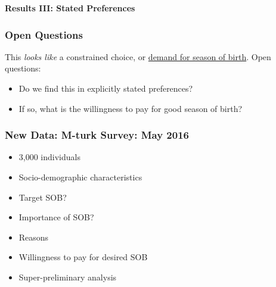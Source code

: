 \documentclass[10pt,letterpaper,subeqn]{beamer}
\begin{document}
\begin{frame}
  \begin{center}
    \textbf{Results III: Stated Preferences}
  \end{center}
\end{frame}


\begin{frame}
  \frametitle{Open Questions}
  This \emph{looks like} a constrained choice, or \underline{demand for season of birth}. Open questions:
  \vspace{3mm} \\
  \begin{itemize}
  \item Do we find this in explicitly \textcolor[rgb]{1.00,0.00,0.00}{stated preferences}?
  \item If so, what is the \textcolor[rgb]{0.00,0.18,0.51}{willingness to pay} for good season of birth?
  \end{itemize}
\end{frame}


\begin{frame}
  \frametitle{New Data: M-turk Survey: May 2016}
  \begin{itemize}
  \item 3,000 individuals
  \item Socio-demographic characteristics
  \item Target SOB?
  \item Importance of SOB?
  \item Reasons
  \item Willingness to pay for desired SOB
  \item \textcolor[rgb]{1.00,0.00,0.00}{Super-preliminary analysis}
  \end{itemize}
\end{frame}


\end{document}
